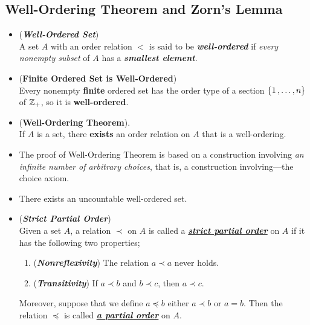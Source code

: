 \documentclass[11pt]{article}
\begin{document}
\subsection{Well-Ordering Theorem and Zorn's Lemma}
\begin{itemize}
\item \begin{definition} (\emph{\textbf{Well-Ordered Set}}) \\
A set $A$ with an order relation $<$ is said to be \emph{\textbf{well-ordered}} if \emph{every nonempty subset} of $A$ has a \emph{\textbf{smallest element}}.
\end{definition}

\item \begin{proposition} (\textbf{Finite Ordered Set is Well-Ordered}) \citep{munkres2000topology} \\
Every nonempty \textbf{finite} ordered set has the order type of a section $\{1 \,{,}\ldots{,}\, n\}$ of ${\mathbb Z}_{+}$, so it is \textbf{well-ordered}.
\end{proposition}

\item \begin{theorem} (\textbf{Well-Ordering Theorem}). \citep{munkres2000topology} \\
If $A$ is a set, there \textbf{exists} an order relation on $A$ that is a well-ordering.
\end{theorem}

\item \begin{remark}
The proof of Well-Ordering Theorem is based on a construction involving \textit{an infinite number of arbitrary choices}, that is, a construction involving—the choice axiom.
\end{remark}

\item \begin{corollary}
There exists an uncountable well-ordered set.
\end{corollary}

\item \begin{definition} (\emph{\textbf{Strict Partial Order}})\\
Given a set $A$, a relation $\prec$ on $A$ is called a \underline{\emph{\textbf{strict partial order}}} on $A$ if it has the following two properties;
\begin{enumerate}
\item (\emph{\textbf{Nonreflexivity}}) The relation $a \prec a$ never holds.
\item (\emph{\textbf{Transitivity}}) If $a \prec b$ and $b \prec c$, then $a \prec c$.
\end{enumerate}
Moreover, suppose that we define $a \preceq b$ either $a \prec b$ or $a = b$. Then the relation $\preceq$ is called \underline{\emph{\textbf{a partial order}}} on $A$.
\end{definition}


\end{itemize}
\end{document}
